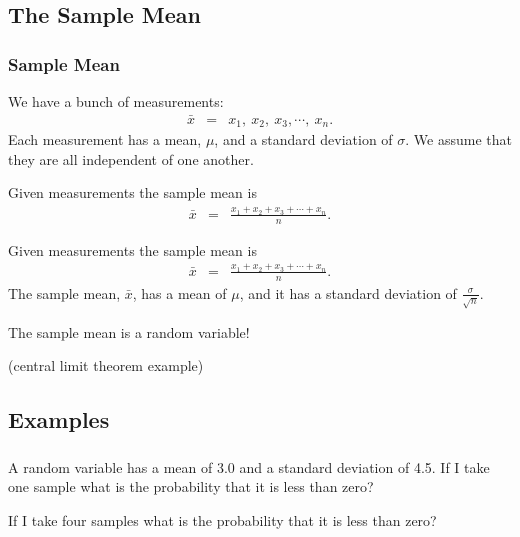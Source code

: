 \subsection{The Sample Mean}

\begin{frame}
  \frametitle{Sample Mean}

  We have a bunch of measurements:
  \begin{eqnarray*}
    \bar{x} & = & x_1,~x_2,~x_3,\cdots,~x_n.
  \end{eqnarray*}
  Each measurement has a mean, $\mu$, and a standard deviation of
  $\sigma$. We assume that they are all independent of one another.
  
  {
    \begin{definition}
      Given measurements the sample mean is 
      \begin{eqnarray*}
        \bar{x} & = & \frac{x_1+x_2+x_3+\cdots+x_n}{n}.
      \end{eqnarray*}
    \end{definition}
  }

  {
    \begin{definition}
      Given measurements the sample mean is 
      \begin{eqnarray*}
        \bar{x} & = & \frac{x_1+x_2+x_3+\cdots+x_n}{n}.
      \end{eqnarray*}
      The sample mean, $\bar{x}$,  has a mean of $\mu$, and it has a
      standard deviation of $\frac{\sigma}{\sqrt{n}}$.
    \end{definition}
  }


  {
    The sample mean is a random variable!
  }

\end{frame}


\begin{frame}
  (central limit theorem example)
\end{frame}

\subsection{Examples}

\begin{frame}
  \frametitle{}

  A random variable has a mean of 3.0 and a standard deviation of
  4.5. If I take one sample what is the probability that it is less
  than zero?

  \vfill

  {
    If I take four samples what is the probability that it is less
    than zero?
  }

  \vfill

\end{frame}


